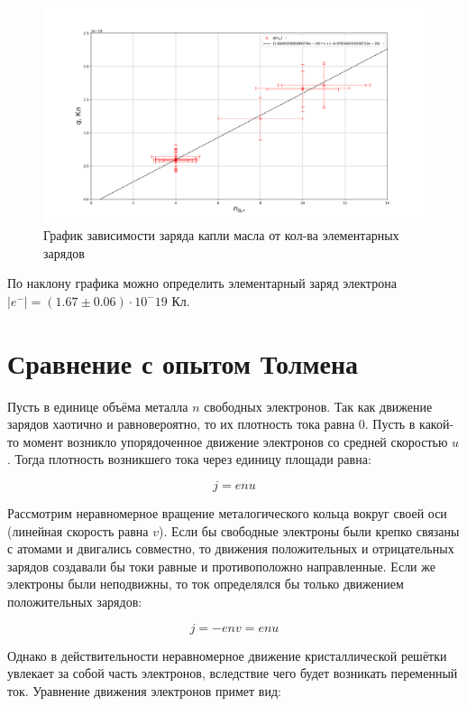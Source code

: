 \documentclass{lab}
\begin{document}
\begin{figure}[H]
    \centering
    \includegraphics[width=\textwidth]{graph.png}
    \caption{График зависимости заряда капли масла от кол-ва элементарных зарядов}
    \label{graph:q_n}
\end{figure}

По наклону графика можно определить элементарный заряд электрона $|e^{-}| = (1.67 \pm 0.06) \cdot 10^-19$ Кл.

\section{Сравнение с опытом Толмена}

Пусть в единице объёма металла $n$ свободных электронов. Так как движение зарядов хаотично и равновероятно, то их плотность тока равна 0. Пусть в какой-то момент возникло упорядоченное движение электронов со средней скоростью $u$. Тогда плотность возникшего тока через единицу площади равна:

\begin{equation}
    j = enu
\end{equation}

Рассмотрим неравномерное вращение металогического кольца вокруг своей оси (линейная скорость равна $v$). Если бы свободные электроны были крепко связаны с атомами и двигались совместно, то движения положительных и отрицательных зарядов создавали бы токи равные и противоположно направленные. Если же электроны были неподвижны, то ток определялся бы только движением положительных зарядов:

\begin{equation}
    j = -env = enu
\end{equation}

Однако в действительности неравномерное движение кристаллической решётки увлекает за собой часть электронов, вследствие чего будет возникать переменный ток.
Уравнение движения электронов примет вид:
\end{document}
